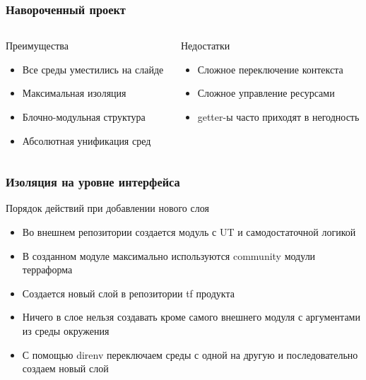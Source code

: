 \documentclass[mathserif,serif]{beamer}
\begin{document}
\begin{frame}
	\frametitle{Навороченный проект}
	\begin{columns}[T]
		\begin{column}{.5\linewidth}
			\begin{minipage}[c][\textheight][c]{\linewidth}
          			Преимущества
				\begin{itemize}
					\item{Все среды уместились на слайде}
					\item{Максимальная изоляция}
					\item{Блочно-модульная структура}
					\item{Абсолютная унификация сред}
				\end{itemize}
			\end{minipage}
		\end{column}
		\begin{column}{.5\linewidth}
			\begin{minipage}[c][\textheight][c]{\linewidth}
          			Недостатки
				\begin{itemize}
					\item{Сложное переключение контекста}
					\item{Сложное управление ресурсами}
					\item{getter-ы часто приходят в негодность}
				\end{itemize}
			\end{minipage}
		\end{column}
	\end{columns}
\end{frame}

\begin{frame}
	\frametitle{Изоляция на уровне интерфейса}
	Порядок действий при добавлении нового слоя
	\begin{itemize}
		\item{Во внешнем репозитории создается модуль с UT и самодостаточной логикой}
		\item{В созданном модуле максимально используются community модули терраформа}
		\item{Создается новый слой в репозитории tf продукта}
		\item{Ничего в слое нельзя создавать кроме самого внешнего модуля с аргументами из среды окружения}
		\item{С помощью direnv переключаем среды с одной на другую и последовательно создаем новый слой}
	\end{itemize}
\end{frame}
\end{document}

